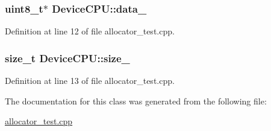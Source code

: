 \subsubsection[{\texorpdfstring{data\+\_\+}{data_}}]{\setlength{\rightskip}{0pt plus 5cm}uint8\+\_\+t$\ast$ Device\+C\+P\+U\+::data\+\_\+\hspace{0.3cm}{\ttfamily [private]}}\hypertarget{classDeviceCPU_a90432e8ebf17e7b2eb184a47bee74bf5}{}\label{classDeviceCPU_a90432e8ebf17e7b2eb184a47bee74bf5}


Definition at line 12 of file allocator\+\_\+test.\+cpp.

\subsubsection[{\texorpdfstring{size\+\_\+}{size_}}]{\setlength{\rightskip}{0pt plus 5cm}size\+\_\+t Device\+C\+P\+U\+::size\+\_\+\hspace{0.3cm}{\ttfamily [private]}}\hypertarget{classDeviceCPU_a6e8ad38cd656798fa20752238dcd1c83}{}\label{classDeviceCPU_a6e8ad38cd656798fa20752238dcd1c83}


Definition at line 13 of file allocator\+\_\+test.\+cpp.



The documentation for this class was generated from the following file\+:\begin{DoxyCompactItemize}
\item 
\hyperlink{allocator__test_8cpp}{allocator\+\_\+test.\+cpp}\end{DoxyCompactItemize}
